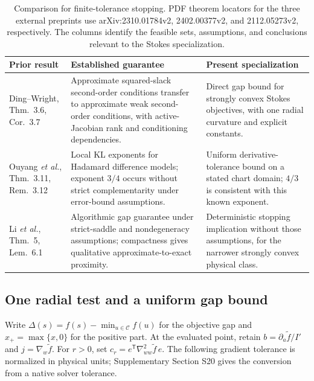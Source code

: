 \begin{table}[!t]
\caption{Comparison for finite-tolerance stopping. PDF theorem locators for the three external preprints use arXiv:2310.01784v2, 2402.00377v2, and 2112.05273v2, respectively. The columns identify the feasible sets, assumptions, and conclusions relevant to the Stokes specialization.}
\label{tab:stoppingprior}
\centering\small\renewcommand{\arraystretch}{1.12}
\begin{tabularx}{\textwidth}{@{}p{}p{}X@{}}\toprule
Prior result & Established guarantee & Present specialization\\\midrule
Ding--Wright, Thm.~3.6, Cor.~3.7 \cite{dingwright} & Approximate squared-slack second-order conditions transfer to approximate weak second-order conditions, with active-Jacobian rank and conditioning dependencies. & Direct gap bound for strongly convex Stokes objectives, with one radial curvature and explicit constants.\\
Ouyang \emph{et al.}, Thm.~3.11, Rem.~3.12 \cite{ouyang} & Local KL exponents for Hadamard difference models; exponent $3/4$ occurs without strict complementarity under error-bound assumptions. & Uniform derivative-tolerance bound on a stated chart domain; $4/3$ is consistent with this known exponent.\\
Li \emph{et al.}, Thm.~5, Lem.~6.1 \cite{hadamard} & Algorithmic gap guarantee under strict-saddle and nondegeneracy assumptions; compactness gives qualitative approximate-to-exact proximity. & Deterministic stopping implication without those assumptions, for the narrower strongly convex physical class.\\\bottomrule
\end{tabularx}
\end{table}

\subsection{One radial test and a uniform gap bound}
Write $\Delta(s)=f(s)-\min_{u\in\mathcal C}f(u)$ for the objective gap and $x_+=\max\{x,0\}$ for the positive part. At the evaluated point, retain $b=\partial_a\widetilde f/I'$ and $j=\nabla_w\widetilde f$. For $r>0$, set $c_r=e^{\mathsf T}\nabla^2_{ww}\widetilde f\,e$. The following gradient tolerance is normalized in physical units; Supplementary Section S20 gives the conversion from a native solver tolerance.

